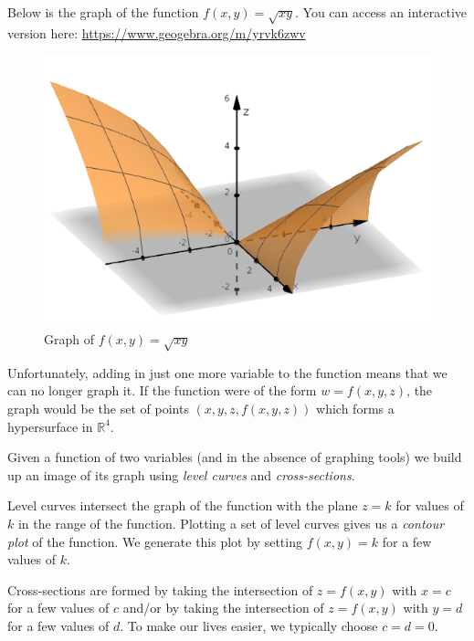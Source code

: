 \documentclass[
]{book}
\theoremstyle{definition}
\theoremstyle{definition}
\theoremstyle{definition}
\theoremstyle{definition}
\theoremstyle{remark}
\begin{document}
Below is the graph of the function \(f(x,y)=\sqrt{xy}\). You can access an interactive version here: \url{https://www.geogebra.org/m/yrvk6zwv}

\begin{figure}

{\centering \includegraphics[width=0.5\linewidth]{images/sqrtxy} 

}

\caption{Graph of $f(x,y)=\sqrt{xy}$}\label{fig:unnamed-chunk-1}
\end{figure}

Unfortunately, adding in just one more variable to the function means that we can no longer graph it. If the function were of the form \(w=f(x,y,z)\), the graph would be the set of points \((x,y,z,f(x,y,z))\) which forms a hypersurface in \(\mathbb{R}^4\).

Given a function of two variables (and in the absence of graphing tools) we build up an image of its graph using \emph{level curves} and \emph{cross-sections}.

Level curves intersect the graph of the function with the plane \(z=k\) for values of \(k\) in the range of the function. Plotting a set of level curves gives us a \emph{contour plot} of the function. We generate this plot by setting \(f(x,y)=k\) for a few values of \(k\).

Cross-sections are formed by taking the intersection of \(z=f(x,y)\) with \(x= c\) for a few values of \(c\) and/or by taking the intersection of \(z=f(x,y)\) with \(y= d\) for a few values of \(d\). To make our lives easier, we typically choose \(c=d=0\).
\end{document}
